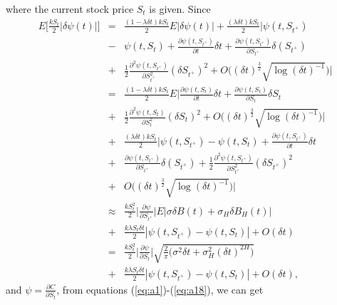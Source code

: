 \documentclass[a4paper,11pt]{amsart}
\numberwithin{equation}{section}
\theoremstyle{definition}
\theoremstyle{plain}
\theoremstyle{definition}
\newcommand{\1}{\mathbf{1}}
\begin{document}
where the current stock price $S_t$ is given.
Since
\begin{eqnarray}
E\Big[\frac{kS_t}{2}|\delta \psi(t)|\Big]&=&\frac{(1-\lambda \delta t)kS_t}{2}E|\delta \psi(t)|+\frac{(\lambda\delta t)kS_t}{2}\Big|\psi(t,S_{t^+})\nonumber\\
&-&\psi(t,S_t)
+\frac{\partial \psi(t,S_{t^+})}{\partial t}\delta t+\frac{\partial \psi(t,S_{t^+})}{\partial S_{t^+}}\delta (S_{t^+})\nonumber\\
&+&\frac{1}{2}\frac{\partial^2\psi(t,S_{t^+})}{\partial S_{t^+}^2}(\delta S_{t^+})^2+O\big((\delta t)^{\frac{3}{2}}\sqrt{\log (\delta t)^{-1}}\big)\Big|\nonumber\\
&=&\frac{(1-\lambda \delta t)kS_t}{2}E\Big|\frac{\partial \psi(t,S_t)}{\partial t}\delta t+\frac{\partial \psi(t,S_t)}{\partial S_t}\delta S_t\nonumber\\
&+&\frac{1}{2}\frac{\partial^2\psi(t,S_t)}{\partial S_t^2}(\delta S_t)^2
+O\big((\delta t)^{\frac{3}{2}}\sqrt{\log (\delta t)^{-1}}\big)\Big|\nonumber\\
&+&\frac{(\lambda\delta t)kS_t}{2}\Big|\psi(t,S_{t^+})
-\psi(t,S_t)+\frac{\partial \psi(t,S_{t^+})}{\partial t}\delta t\nonumber\\
&+&\frac{\partial \psi(t,S_{t^+})}{\partial S_{t^+}}\delta (S_{t^+})+\frac{1}{2}\frac{\partial^2\psi(t,S_{t^+})}{\partial S_{t^+}^2}(\delta S_{t^+})^2\nonumber\\
&+&O\big((\delta t)^{\frac{3}{2}}\sqrt{\log (\delta t)^{-1}}\big)\Big|\nonumber\\
&\approx&\frac{kS_t^2}{2}\Big|\frac{\partial \psi}{\partial S_{t^+}}\Big|E|\sigma\delta B(t)+\sigma_H\delta B_H(t)|\nonumber\\
&+&\frac{k\lambda S_t\delta t}{2}|\psi(t,S_{t^+})-\psi(t,S_t)|+O(\delta t)\nonumber\\
&=&\frac{kS_t^2}{2}\Big|\frac{\partial \psi}{\partial S_t}\Big|\sqrt{\frac{2}{\pi}\Big(\sigma^2\delta t+\sigma_H^2(\delta t)^{2H}\Big)}\nonumber\\
&+&\frac{k\lambda S_t\delta t}{2}|\psi(t,S_{t^+})-\psi(t,S_t)|+O(\delta t),
\label{eq:a19}
\end{eqnarray}
and $\psi=\frac{\partial C}{\partial S_t}$, from equations (\ref{eq:a1})-(\ref{eq:a18}), we can get
\end{document}
